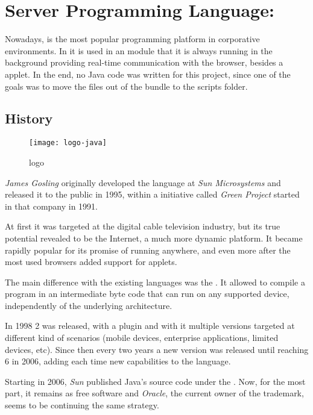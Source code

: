 \section{Server Programming Language: } %
\label{sec:java}

Nowadays,  is the most popular programming platform in corporative environments.
In  it is used in an  module that it is always running in the background providing real-time communication with the browser, besides a  applet.
In the end, no Java code was written for this project, since one of the goals was to move the files out of the  bundle to the  scripts folder.

\subsection{History} %
\label{sub:javahistory}

\begin{wrapfigure}{r}{0.5\textwidth}
  \centering
    \texttt{[image: logo-java]}
  \caption{ logo}
  \label{fig:logo-java}
\end{wrapfigure}

\emph{James Gosling} originally developed the language at \emph{Sun Microsystems} and released it to the public in 1995, within a initiative called \emph{Green Project} started in that company in 1991.

At first it was targeted at the digital cable television industry, but its true potential revealed to be the Internet, a much more dynamic platform.
It became rapidly popular for its promise of running anywhere, and even more after the most used browsers added support for  applets.

The main difference with the existing languages was the .
It allowed to compile a program in an intermediate byte code that can run on any  supported device, independently of the underlying architecture.

In 1998  2 was released, with a  plugin and with it multiple versions targeted at different kind of scenarios (mobile devices, enterprise applications, limited devices, etc).
Since then every two years a new version was released until reaching  6 in 2006, adding each time new capabilities to the language.

Starting in 2006, \emph{Sun} published Java's source code under the . Now, for the most part, it remains as free software and \emph{Oracle}, the current owner of the trademark, seems to be continuing the same strategy.

